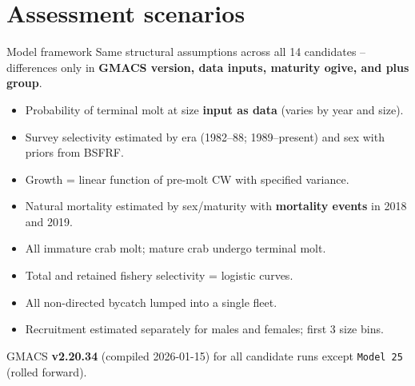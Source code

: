 \documentclass[
  10pt,
  ignorenonframetext,
  aspectratio=169,
]{beamer}
\providecommand{\tightlist}{%
  \setlength{\itemsep}{0pt}\setlength{\parskip}{0pt}}
\begin{document}
\section{Assessment scenarios}\label{assessment-scenarios}

\begin{frame}[fragile]{Model framework}
\label{model-framework}
Same structural assumptions across all 14 candidates -- differences only
in \textbf{GMACS version, data inputs, maturity ogive, and plus group}.

\smallskip
\small

\begin{itemize}
\tightlist
\item
  Probability of terminal molt at size \textbf{input as data} (varies by
  year and size).
\item
  Survey selectivity estimated by era (1982--88; 1989--present) and sex
  with priors from BSFRF.
\item
  Growth = linear function of pre-molt CW with specified variance.
\item
  Natural mortality estimated by sex/maturity with \textbf{mortality
  events} in 2018 and 2019.
\item
  All immature crab molt; mature crab undergo terminal molt.
\item
  Total and retained fishery selectivity = logistic curves.
\item
  All non-directed bycatch lumped into a single fleet.
\item
  Recruitment estimated separately for males and females; first 3 size
  bins.
\end{itemize}

\smallskip

GMACS \textbf{v2.20.34} (compiled 2026-01-15) for all candidate runs
except \texttt{Model\ 25} (rolled forward).
\end{frame}
\end{document}
